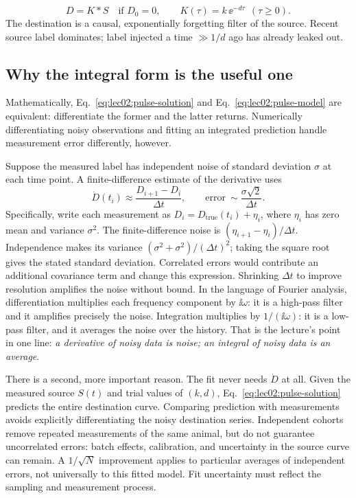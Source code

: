 \begin{equation}\label{eq:lec02:transfer-kernel}
\boxed{D=K*S\quad\text{if }D_0=0,\qquad K(\tau)=k\,\ee^{-d\tau}\ \ (\tau\geq0).}
\end{equation}
The destination is a causal, exponentially forgetting filter of the source. Recent source label dominates; label injected a time $\gg1/d$ ago has already leaked out.

\subsection{Why the integral form is the useful one}\label{subsec:lec02:why-integral}
Mathematically, Eq.~\eqref{eq:lec02:pulse-solution} and Eq.~\eqref{eq:lec02:pulse-model} are equivalent: differentiate the former and the latter returns. Numerically differentiating noisy observations and fitting an integrated prediction handle measurement error differently, however.

Suppose the measured label has independent noise of standard deviation $\sigma$ at each time point. A finite-difference estimate of the derivative uses
\begin{equation}\label{eq:lec02:finite-difference}
\dot D(t_i)\approx\frac{D_{i+1}-D_i}{\Delta t},
\qquad \text{error}\ \sim\frac{\sigma\sqrt2}{\Delta t}.
\end{equation}
Specifically, write each measurement as $D_i=D_{\mathrm{true}}(t_i)+\eta_i$, where $\eta_i$ has zero mean and variance $\sigma^2$. The finite-difference noise is $(\eta_{i+1}-\eta_i)/\Delta t$. Independence makes its variance $(\sigma^2+\sigma^2)/(\Delta t)^2$; taking the square root gives the stated standard deviation. Correlated errors would contribute an additional covariance term and change this expression.
Shrinking $\Delta t$ to improve resolution amplifies the noise without bound. In the language of Fourier analysis, differentiation multiplies each frequency component by $\ii\omega$: it is a high-pass filter and it amplifies precisely the noise. Integration multiplies by $1/(\ii\omega)$: it is a low-pass filter, and it averages the noise over the history. That is the lecture's point in one line: \emph{a derivative of noisy data is noise; an integral of noisy data is an average}.

There is a second, more important reason. The fit never needs $\dot D$ at all. Given the measured source $S(t)$ and trial values of $(k,d)$, Eq.~\eqref{eq:lec02:pulse-solution} predicts the entire destination curve. Comparing prediction with measurements avoids explicitly differentiating the noisy destination series. Independent cohorts remove repeated measurements of the same animal, but do not guarantee uncorrelated errors: batch effects, calibration, and uncertainty in the source curve can remain. A $1/\sqrt{N}$ improvement applies to particular averages of independent errors, not universally to this fitted model. Fit uncertainty must reflect the sampling and measurement process.

